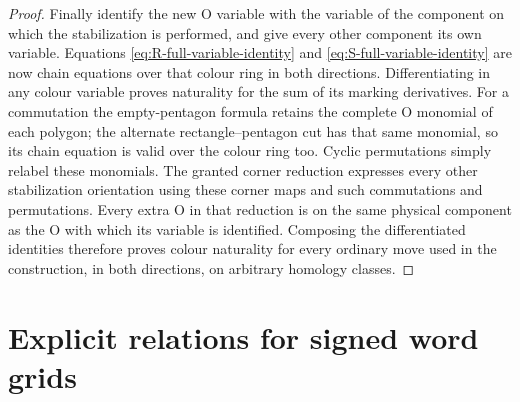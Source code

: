 \documentclass[11pt,a4paper]{article}
\theoremstyle{remark}
\begin{document}
\begin{proof}
Finally identify the new O variable with the variable of the
component on which the stabilization is performed, and give every
other component its own variable.  Equations
\eqref{eq:R-full-variable-identity} and
\eqref{eq:S-full-variable-identity} are now chain equations over
that colour ring in both directions.  Differentiating in any colour
variable proves naturality for the sum of its marking derivatives.
For a commutation the empty-pentagon formula retains the complete
O monomial of each polygon; the alternate rectangle--pentagon cut
has that same monomial, so its chain equation is valid over the
colour ring too.  Cyclic permutations simply relabel these
monomials.  The granted corner reduction expresses every other
stabilization orientation using these corner maps and such
commutations and permutations.  Every extra O in that reduction is
on the same physical component as the O with which its variable is
identified.  Composing the differentiated identities therefore proves
colour naturality for every ordinary move used in the construction,
in both directions, on arbitrary homology classes.

\end{proof}


\section{Explicit relations for signed word grids}
\end{document}
